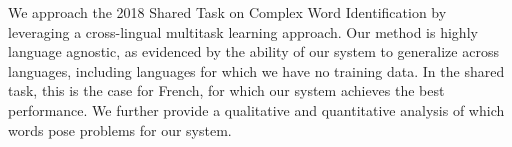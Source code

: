 We approach the 2018 Shared Task on Complex Word Identification by leveraging a cross-lingual multitask learning approach. Our method is highly language agnostic, as evidenced by the ability of our system to generalize across languages, including languages for which we have no training data. In the shared task, this is the case for French, for which our system achieves the best performance. We further provide a qualitative and quantitative analysis of which words pose problems for our system.

